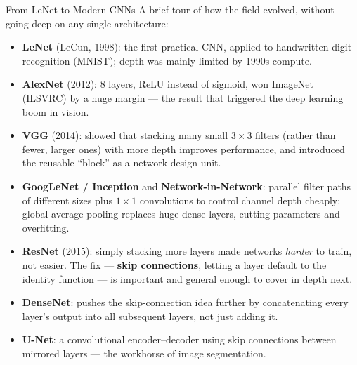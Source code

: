 \begin{vbframe}{From LeNet to Modern CNNs}
A brief tour of how the field evolved, without going deep on any single architecture:
  \begin{itemize}
    \item \textbf{LeNet} (LeCun, 1998): the first practical CNN, applied to handwritten-digit recognition (MNIST); depth was mainly limited by 1990s compute.
    \item \textbf{AlexNet} (2012): 8 layers, ReLU instead of sigmoid, won ImageNet (ILSVRC) by a huge margin --- the result that triggered the deep learning boom in vision.
    \item \textbf{VGG} (2014): showed that stacking many small $3\times 3$ filters (rather than fewer, larger ones) with more depth improves performance, and introduced the reusable \enquote{block} as a network-design unit.
    \item \textbf{GoogLeNet / Inception} and \textbf{Network-in-Network}: parallel filter paths of different sizes plus $1\times 1$ convolutions to control channel depth cheaply; global average pooling replaces huge dense layers, cutting parameters and overfitting.
    \item \textbf{ResNet} (2015): simply stacking more layers made networks \emph{harder} to train, not easier. The fix --- \textbf{skip connections}, letting a layer default to the identity function --- is important and general enough to cover in depth next.
    \item \textbf{DenseNet}: pushes the skip-connection idea further by concatenating every layer's output into all subsequent layers, not just adding it.
    \item \textbf{U-Net}: a convolutional encoder--decoder using skip connections between mirrored layers --- the workhorse of image segmentation.
  \end{itemize}
\end{vbframe}

